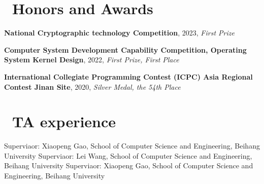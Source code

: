 \documentclass{resume}
\begin{document}
\section{\faCertificate\ Honors and Awards}
\textbf{National Cryptographic technology Competition}, 2023, \textit{First Prize}

\textbf{Computer System Development Capability Competition, Operating System Kernel Design}, 2022,  \textit{First Prize, First Place}

\textbf{International Collegiate Programming Contest (ICPC) Asia Regional Contest Jinan Site}, 2020, \textit{Silver Medal, the 54th Place}

\section{\faHeartO\ TA experience}
Superviaor: Xiaopeng Gao, School of Computer Science and Engineering, Beihang University
Superviaor: Lei Wang, School of Computer Science and Engineering, Beihang University
Superviaor: Xiaopeng Gao, School of Computer Science and Engineering, Beihang University

%
%
\end{document}
